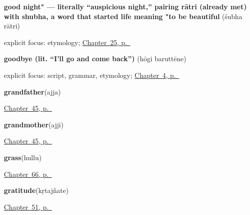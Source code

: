 \noindent\begin{minipage}[t]{\linewidth}
\raggedright
\textbf{good night" — literally \textquotedblleft{}auspicious night,\textquotedblright{} pairing rātri (already met) with shubha, a word that started life meaning "to be beautiful}\enspace\emph{ }\enspace(śubha rātri)\par
\footnotesize explicit focus: etymology; \hyperref[ch:ka-good-night]{Chapter~25, p.~\pageref*{ch:ka-good-night}}
\end{minipage}\par\smallskip

\noindent\begin{minipage}[t]{\linewidth}
\raggedright
\textbf{goodbye (lit. \textquotedblleft{}I'll go and come back\textquotedblright{})}\enspace\emph{ }\enspace(hōgi baruttēne)\par
\footnotesize explicit focus: script, grammar, etymology; \hyperref[ch:farewells]{Chapter~4, p.~\pageref*{ch:farewells}}
\end{minipage}\par\smallskip

\noindent\begin{minipage}[t]{\linewidth}
\raggedright
\textbf{grandfather}\enspace\emph{}\enspace(ajja)\par
\footnotesize \hyperref[ch:ka-older-generation]{Chapter~45, p.~\pageref*{ch:ka-older-generation}}
\end{minipage}\par\smallskip

\noindent\begin{minipage}[t]{\linewidth}
\raggedright
\textbf{grandmother}\enspace\emph{}\enspace(ajji)\par
\footnotesize \hyperref[ch:ka-older-generation]{Chapter~45, p.~\pageref*{ch:ka-older-generation}}
\end{minipage}\par\smallskip

\noindent\begin{minipage}[t]{\linewidth}
\raggedright
\textbf{grass}\enspace\emph{}\enspace(hullu)\par
\footnotesize \hyperref[ch:ka-field]{Chapter~66, p.~\pageref*{ch:ka-field}}
\end{minipage}\par\smallskip

\noindent\begin{minipage}[t]{\linewidth}
\raggedright
\textbf{gratitude}\enspace\emph{}\enspace(kṛtajñate)\par
\footnotesize \hyperref[ch:ka-courtesy]{Chapter~51, p.~\pageref*{ch:ka-courtesy}}
\end{minipage}\par\smallskip

